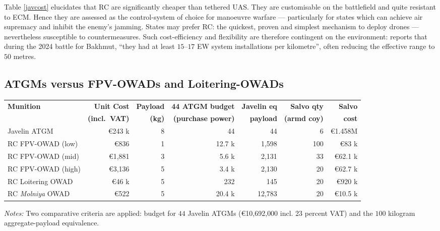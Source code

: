 Table \ref{javcost} elucidates that RC are significantly cheaper than tethered UAS. They are customisable on the battlefield and quite resistant to ECM. Hence they are assessed as the control-system of choice for manoeuvre warfare --- particularly for states which can achieve air supremacy and inhibit the enemy's jamming. States may prefer RC: the quickest, proven and simplest mechanism to deploy drones --- nevertheless susceptible to countermeasures.
Such cost-efficiency and flexibility are therefore contingent on the environment: \textcite[49]{MOLLOY_2024} reports that during the 2024 battle for Bakhmut, ``they had at least $15$--$17$ EW system installations per kilometre'', often reducing the effective range to $50$ metres.

\begin{landscape}
	\section*{ATGMs versus FPV-OWADs and Loitering-OWADs}
	\begin{table}[ht]
		\centering

		
		\begin{tabular}{lrrrr|rr}
			\toprule
			\textbf{Munition} & \textbf{Unit Cost} & \textbf{Payload} & \textbf{44 ATGM budget} & \textbf{Javelin eq} & \textbf{Salvo qty} & \textbf{Salvo} \\
			& \textbf{(incl.\ VAT)} & \textbf{(kg)} & \textbf{(purchase power)} & \textbf{payload} & \textbf{(armd coy)} & \textbf{cost} \\
			\midrule
			Javelin ATGM & \euro243 k & 8 & 44 & 44 & 6 & \euro1.458M \\
			\midrule
			RC FPV-OWAD (low) & \euro836 & 1 & 12.7 k & 1,598 & 100 & \euro83 k \\
			RC FPV-OWAD (mid) & \euro1,881 & 3 & 5.6 k & 2,131 & 33 & \euro62.1 k \\
			RC FPV-OWAD (high) & \euro3,136 & 5 & 3.4 k & 2,130 & 20 & \euro62.7 k \\
			\midrule
			RC Loitering OWAD & \euro46 k & 5 & 232 & 145 & 20 & \euro920 k \\
			RC \textit{Molniya} OWAD & \euro522 & 5 & 20.4 k & 12,783 & 20 & \euro10.5 k \\
			\bottomrule
		\end{tabular}
		\vspace{4pt}
		\begin{minipage}{0.95\linewidth}
			\footnotesize
			\textit{Notes:} Two comparative criteria are applied: budget for $44$ Javelin ATGMs (€10{,}692{,}000 incl. 23 percent VAT) and the $100$ kilogram aggregate-payload equivalence.
			

\end{minipage}
\end{table}
\end{landscape}
